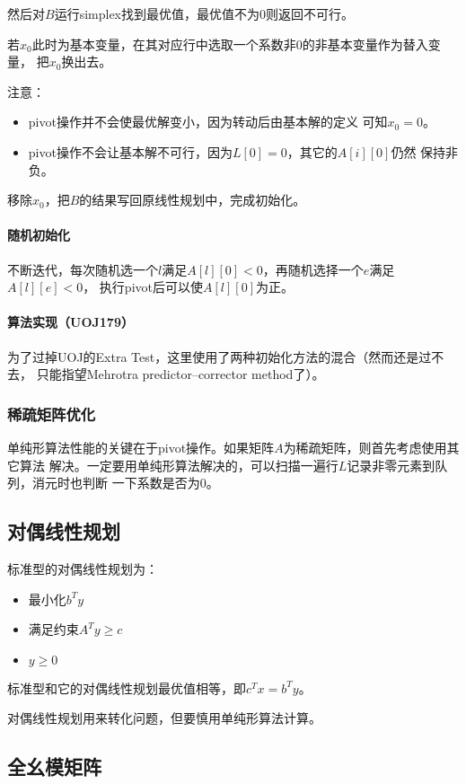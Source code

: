 然后对$B$运行simplex找到最优值，最优值不为0则返回不可行。

若$x_0$此时为基本变量，在其对应行中选取一个系数非0的非基本变量作为替入变量，
把$x_0$换出去。

注意：
\begin{itemize}
    \item pivot操作并不会使最优解变小，因为转动后由基本解的定义
    可知$x_0=0$。
    \item pivot操作不会让基本解不可行，因为$L[0]=0$，其它的$A[i][0]$仍然
    保持非负。
\end{itemize}

移除$x_0$，把$B$的结果写回原线性规划中，完成初始化。
\paragraph{随机初始化}
不断迭代，每次随机选一个$l$满足$A[l][0]<0$，再随机选择一个$e$满足$A[l][e]<0$，
执行pivot后可以使$A[l][0]$为正。
\paragraph{算法实现（UOJ179）}
为了过掉UOJ的Extra Test，这里使用了两种初始化方法的混合（然而还是过不去，
只能指望Mehrotra predictor–corrector method了）。


\subsubsection{稀疏矩阵优化}
单纯形算法性能的关键在于pivot操作。如果矩阵$A$为稀疏矩阵，则首先考虑使用其它算法
解决。一定要用单纯形算法解决的，可以扫描一遍行$L$记录非零元素到队列，消元时也判断
一下系数是否为0。
\subsection{对偶线性规划}
标准型的对偶线性规划为：
\begin{itemize}
    \item 最小化$b^Ty$
    \item 满足约束$A^Ty\geq c$
    \item $y\geq 0$
\end{itemize}

标准型和它的对偶线性规划最优值相等，即$c^Tx=b^Ty$。

对偶线性规划用来转化问题，但要慎用单纯形算法计算。
\subsection{全幺模矩阵}

